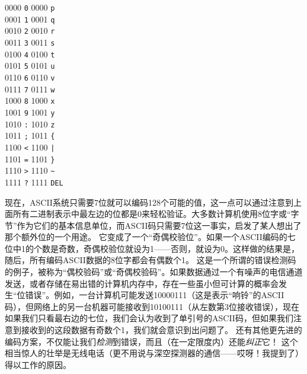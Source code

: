 \begin{tabbing}
  0000 \>\verb+0+     0000 \>\verb+p+  \\ 
  0001 \>\verb+1+     0001 \>\verb+q+  \\ 
  0010 \>\verb+2+     0010 \>\verb+r+  \\ 
  0011 \>\verb+3+     0011 \>\verb+s+  \\ 
  0100 \>\verb+4+     0100 \>\verb+t+  \\ 
  0101 \>\verb+5+     0101 \>\verb+u+  \\ 
  0110 \>\verb+6+     0110 \>\verb+v+  \\ 
  0111 \>\verb+7+     0111 \>\verb+w+  \\ 
  1000 \>\verb+8+     1000 \>\verb+x+  \\ 
  1001 \>\verb+9+     1001 \>\verb+y+  \\ 
  1010 \>\verb+:+     1010 \>\verb+z+  \\ 
  1011 \>\verb+;+     1011 \>\verb+{+  \\ 
  1100 \>\verb+<+     1100 \>\verb+|+  \\ 
  1101 \>\verb+=+     1101 \>\verb+}+  \\ 
  1110 \>\verb+>+     1110 \>\verb+~+  \\ 
  1111 \>\verb+?+     1111 \>\verb+DEL+  \\ 
\end{tabbing}

\renewcommand{\baselinestretch}{1.3}
\renewcommand{\arraystretch}{.77}


\small \normalsize

现在，ASCII系统只需要7位就可以编码128个可能的值，这一点可以通过注意到上面所有二进制表示中最左边的位都是0来轻松验证。大多数计算机使用8位字或“字节”作为它们的基本信息单位，而ASCII码只需要7位这一事实，启发了某人想出了那个额外位的一个用途。
它变成了一个“奇偶校验位”。如果一个ASCII编码的七位中1的个数是奇数，奇偶校验位就设为1——否则，就设为0。这样做的结果是，随后，所有编码ASCII数据的8位字都会有偶数个1。
这是一个所谓的错误检测码的例子，被称为“偶校验码”或“奇偶校验码”。如果数据通过一个有噪声的电信通道发送，或者存储在易出错的计算机内存中，存在一些虽小但可计算的概率会发生“位错误”。例如，一台计算机可能发送10000111（这是表示“响铃”的ASCII码），但网络上的另一台机器可能接收到10100111（从左数第3位接收错误），现在如果我们只看最右边的七位，我们会认为收到了单引号的ASCII码，但如果我们注意到接收到的这段数据有奇数个1，我们就会意识到出问题了。
还有其他更先进的编码方案，不仅能让我们\emph{检测}到错误，而且（在一定限度内）还能\emph{纠正}它！
这个相当惊人的壮举是无线电话（更不用说与深空探测器的通信——哎呀！我提到了）得以工作的原因。

